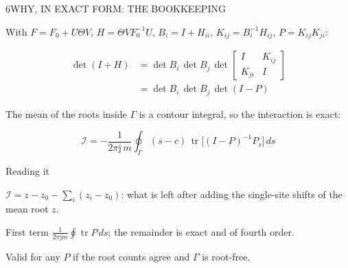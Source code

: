 \begin{minipage}[t][\PosterMiddleRowHeight][t]{\PosterHalfWidth}\vspace{0pt}
  \begin{PosterPanel}{\PosterMiddleRowHeight}{6}{WHY, IN EXACT FORM: THE BOOKKEEPING}

    \noindent\begin{minipage}[t]{272mm}\vspace{0pt}
      {\FigureSize With $F=F_0+U\Theta V$, $H=\Theta VF_0^{-1}U$, $B_i=I+H_{ii}$, $K_{ij}=B_i^{-1}H_{ij}$, $P=K_{ij}K_{ji}$:\par}
      {\fontsize{31pt}{35pt}\selectfont\color{IASDarkText}\[
        \begin{aligned}
          \det(I+H)&=\det B_i\,\det B_j\,\det\!\begin{bmatrix}I&K_{ij}\\K_{ji}&I\end{bmatrix}\\
          &=\det B_i\,\det B_j\,\det(I-P)
        \end{aligned}
      \]}
      \vspace{1mm}
      {\FigureSize The mean of the roots inside $\Gamma$ is a contour integral, so the interaction is exact:\par}
      {\fontsize{33pt}{38pt}\selectfont\color{IASBlue}\[
        \mathcal I=-\frac{1}{2\pi\mathrm{j}\,m}\oint_{\Gamma}(s-c)\,
          \operatorname{tr}\!\big[(I-P)^{-1}P_s\big]\,ds
      \]}
    \end{minipage}\hfill%
    \begin{minipage}[t]{146mm}\vspace{0pt}
      {\Subhead\color{IASDarkGreen}Reading it\par}\vspace{1mm}
      {\FigureSize $\mathcal I=z-z_0-\sum_i(z_i-z_0)$: what is left after adding the single-site shifts of the mean root $z$.\par}\vspace{2mm}
      {\FigureSize First term $\frac{1}{2\pi\mathrm{j}m}\oint\operatorname{tr}P\,ds$; the remainder is exact and of fourth order.\par}\vspace{2mm}
      {\FigureSize Valid for any $P$ if the root counts agree and $\Gamma$ is root-free.\par}
    \end{minipage}\par

  \end{PosterPanel}
\end{minipage}%
